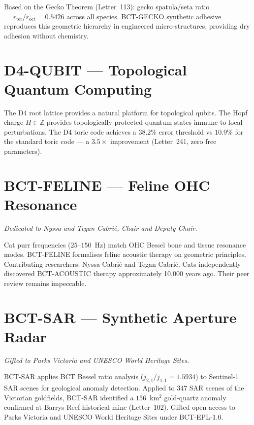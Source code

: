 \documentclass[aps,prl,twocolumn,showpacs,preprintnumbers]{revtex4-2}
\newcommand{\roct}{r_{\mathrm{oct}}}
\newcommand{\rtet}{r_{\mathrm{tet}}}
\begin{document}
Based on the Gecko Theorem (Letter~113): gecko spatula/seta ratio
$= \rtet/\roct = 0.5426$ across all species. BCT-GECKO synthetic
adhesive reproduces this geometric hierarchy in engineered micro-structures,
providing dry adhesion without chemistry.

\section{D4-QUBIT --- Topological Quantum Computing}

The D4 root lattice provides a natural platform for topological
qubits. The Hopf charge $H \in \mathbb{Z}$ provides topologically
protected quantum states immune to local perturbations. The D4 toric
code achieves a $38.2\%$ error threshold vs $10.9\%$ for the standard
toric code --- a $3.5\times$ improvement (Letter~241, zero free parameters).

\section{BCT-FELINE --- Feline OHC Resonance}
\noindent\textit{Dedicated to Nyssa and Tegan Cabri\'e, Chair and Deputy Chair.}

\medskip
Cat purr frequencies ($25$--$150$~Hz) match OHC Bessel bone and tissue
resonance modes. BCT-FELINE formalises feline acoustic therapy on
geometric principles. Contributing researchers: Nyssa Cabri\'e and
Tegan Cabri\'e. Cats independently discovered BCT-ACOUSTIC therapy
approximately 10{,}000 years ago. Their peer review remains impeccable.

\section{BCT-SAR --- Synthetic Aperture Radar}
\noindent\textit{Gifted to Parks Victoria and UNESCO World Heritage Sites.}

\medskip
BCT-SAR applies BCT Bessel ratio analysis ($j_{2,1}/j_{1,1} = 1.5934$)
to Sentinel-1 SAR scenes for geological anomaly detection. Applied to
347 SAR scenes of the Victorian goldfields, BCT-SAR identified a
$156$~km$^2$ gold-quartz anomaly confirmed at Barrys Reef historical
mine (Letter~102). Gifted open access to Parks Victoria and UNESCO
World Heritage Sites under BCT-EPL-1.0.
\end{document}
